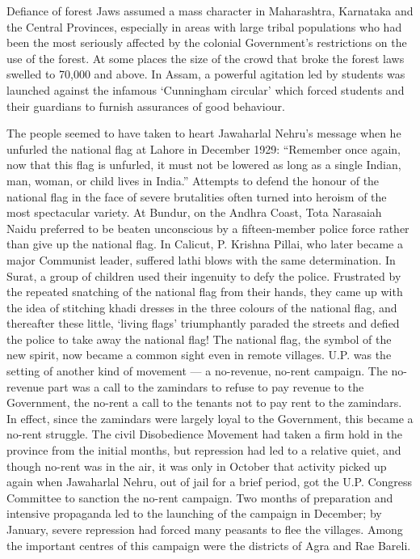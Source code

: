 \begin{multicols}{2}
Defiance of forest Jaws assumed a mass character in Maharashtra, Karnataka and the Central Provinces, especially in areas with large tribal populations who had been the most seriously affected by the colonial Government's restrictions on the use of the forest. At some places the size of the crowd that broke the forest laws swelled to 70,000 and above. In Assam, a powerful agitation led by students was launched against the infamous `Cunningham circular' which forced students and their guardians to furnish assurances of good behaviour.

The people seemed to have taken to heart Jawaharlal Nehru's message when he unfurled the national flag at Lahore in December 1929: ``Remember once again, now that this flag is unfurled, it must not be lowered as long as a single Indian, man, woman, or child lives in India.'' Attempts to defend the honour of the national flag in the face of severe brutalities often turned into heroism of the most spectacular variety. At Bundur, on the Andhra Coast, Tota Narasaiah Naidu preferred to be beaten unconscious by a fifteen-member police force rather than give up the national flag. In Calicut, P. Krishna Pillai, who later became a major Communist leader, suffered lathi blows with the same determination. In Surat, a group of children used their ingenuity to defy the police. Frustrated by the repeated snatching of the national flag from their hands, they came up with the idea of stitching khadi dresses in the three colours of the national flag, and thereafter these little, `living flags' triumphantly paraded the streets and defied the police to take away the national flag! The national flag, the symbol of the new spirit, now became a common sight even in remote villages. U.P. was the setting of another kind of movement --- a no-revenue, no-rent campaign. The no-revenue part was a call to the zamindars to refuse to pay revenue to the Government, the no-rent a call to the tenants not to pay rent to the zamindars. In effect, since the zamindars were largely loyal to the Government, this became a no-rent struggle. The civil Disobedience Movement had taken a firm hold in the province from the initial months, but repression had led to a relative quiet, and though no-rent was in the air, it was only in October that activity picked up again when Jawaharlal Nehru, out of jail for a brief period, got the U.P. Congress Committee to sanction the no-rent campaign. Two months of preparation and intensive propaganda led to the launching of the campaign in December; by January, severe repression had forced many peasants to flee the villages. Among the important centres of this campaign were the districts of Agra and Rae Bareli.


\end{multicols}
